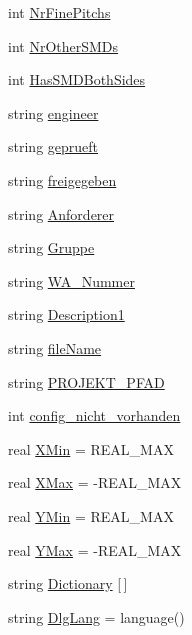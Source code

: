 \begin{DoxyCompactItemize}
\item 
int \hyperlink{_l_p-_daten_8ulp_a38fc05ac7340aa27afc7b37e846db003}{Nr\+Fine\+Pitchs}
\item 
int \hyperlink{_l_p-_daten_8ulp_a48a0d606a48307103a8dac0c46b83f38}{Nr\+Other\+S\+M\+Ds}
\item 
int \hyperlink{_l_p-_daten_8ulp_aa0267591824a2748576aaf3d22e354e0}{Has\+S\+M\+D\+Both\+Sides}
\item 
string \hyperlink{_l_p-_daten_8ulp_a631ee32a616cc0d4795fdaeacb8a01a8}{engineer}
\item 
string \hyperlink{_l_p-_daten_8ulp_a285b7e5593b6948aedaaba97394ca9ac}{geprueft}
\item 
string \hyperlink{_l_p-_daten_8ulp_a06d333dc9622bc3a8b4e590022c75297}{freigegeben}
\item 
string \hyperlink{_l_p-_daten_8ulp_a59516eab445b28415bdf1d48fc65db95}{Anforderer}
\item 
string \hyperlink{_l_p-_daten_8ulp_a47d4dad2288e4e9d400c39dc34630b01}{Gruppe}
\item 
string \hyperlink{_l_p-_daten_8ulp_a190c864c13eed4946823ed73c1865058}{W\+A\+\_\+\+Nummer}
\item 
string \hyperlink{_l_p-_daten_8ulp_a1c49af292eb3eacb5f8614583d761bf7}{Description1}
\item 
string \hyperlink{_l_p-_daten_8ulp_a71f006e8d6ac2a5d94354155a0da69f8}{file\+Name}
\item 
string \hyperlink{_l_p-_daten_8ulp_a646f3371d3767b31d185e665e471cd8c}{P\+R\+O\+J\+E\+K\+T\+\_\+\+P\+F\+A\+D}
\item 
int \hyperlink{_l_p-_daten_8ulp_a45e22d9db317238127f2a1d385e17c1c}{config\+\_\+nicht\+\_\+vorhanden}
\item 
real \hyperlink{_l_p-_daten_8ulp_a978c5c7f4d89b1dd09870542306e065c}{X\+Min} = R\+E\+A\+L\+\_\+\+M\+A\+X
\item 
real \hyperlink{_l_p-_daten_8ulp_aeaec557beb34472feff2cb21ba458b09}{X\+Max} = -\/R\+E\+A\+L\+\_\+\+M\+A\+X
\item 
real \hyperlink{_l_p-_daten_8ulp_a7bad6a0d655aa9b7a6c2bb3b26a89f3a}{Y\+Min} = R\+E\+A\+L\+\_\+\+M\+A\+X
\item 
real \hyperlink{_l_p-_daten_8ulp_a6b5cc99ec8ac1929b5ca571f5a0f56c8}{Y\+Max} = -\/R\+E\+A\+L\+\_\+\+M\+A\+X
\item 
string \hyperlink{_l_p-_daten_8ulp_a82291247e79bbab858c4aa4dd4495d6b}{Dictionary} \mbox{[}$\,$\mbox{]}
\item 
string \hyperlink{_l_p-_daten_8ulp_a808b87f9418f3acfded801090fcadf74}{Dlg\+Lang} = language()

\end{DoxyCompactItemize}
